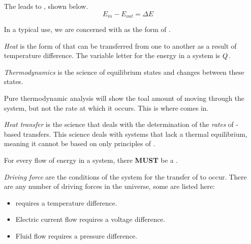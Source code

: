 The  leads to , shown below.
\begin{equation}\label{eq:Energy_Change}
  E_{in} - E_{out} = \Delta E
\end{equation}

In a typical use, we are concerned with  as the form of .
\begin{definition}[Heat]\label{def:Heat}
  \emph{Heat} is the form of  that can be transferred from one  to another as a result of temperature difference.
  The variable letter for the energy in a system is $Q$.
\end{definition}

\begin{definition}[Thermodynamics]\label{def:Thermodynamics}
  \emph{Thermodynamics} is the science of equilibrium states and changes between these states.
\end{definition}

Pure thermodynamic analysis will show the toal amount of  moving through the system, but not the rate at which it occurs.
This is where  comes in.

\begin{definition}\label{def:Heat_Transfer}
  \emph{Heat transfer} is the science that deals with the determination of the \textit{rates} of -based  transfers.
  This science deals with systems that lack a thermal equilibrium, meaning it cannot be based on only principles of .
\end{definition}

For every flow of energy in a system, there \textbf{MUST} be a .
\begin{definition}\label{def:Driving_Force}
  \emph{Driving force} are the conditions of the system for the transfer of  to occur.
  There are any number of driving forces in the universe, some are listed here:
  \begin{itemize}[noitemsep]
  \item {} requires a temperature difference.
  \item Electric current flow requires a voltage difference.
  \item Fluid flow requires a pressure difference.
  \end{itemize}
\end{definition}

